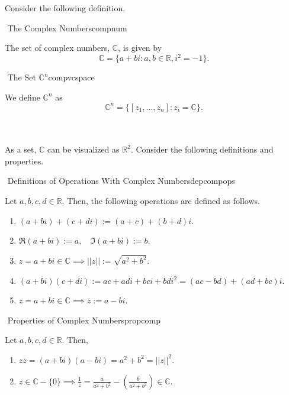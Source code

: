         Consider the following definition.
        \begin{definition}{\Stop\,\,The Complex Numbers}{compnum}

            The set of complex numbers, \(\mathbb{C}\), is given by
            \begin{equation*}
                \mathbb{C}=\{a+bi:a,b\in\mathbb{R},i^2=-1\}.
            \end{equation*}
            
        \end{definition}
        \begin{definition}{\Stop\,\,The Set \(\mathbb{C}^n\)}{compvcspace}

            We define \(\mathbb{C}^n\) as
            \begin{equation*}
                \mathbb{C}^n=\{[z_1,\ldots,z_n]:z_i=\mathbb{C}\}.
            \end{equation*}
            
        \end{definition}
        \vphantom
        \\
        \\
        As a set, \(\mathbb{C}\) can be visualized as \(\mathbb{R}^2\). Consider the following definitions and properties.
        \begin{definition}{\Stop\,\,Definitions of Operations With Complex Numbers}{depcompops}
            
            Let \(a,b,c,d\in\mathbb{R}\). Then, the following operations are defined as follows.
            \begin{enumerate}
                \item \((a+bi)+(c+di):=(a+c)+(b+d)i\).
                \item \(\Re (a+bi):=a,\quad \Im (a+bi):=b\).
                \item \(z=a+bi\in\mathbb{C}\implies||z||:=\sqrt{a^2+b^2}\).
                \item \((a+bi)(c+di):=ac+adi+bci+bdi^2=(ac-bd)+(ad+bc)i\).
                \item \(z=a+bi\in\mathbb{C}\implies\bar{z}:=a-bi\).
            \end{enumerate}

        \end{definition}
        \begin{theorem}{\Stop\,\,Properties of Complex Numbers}{propcomp}
            
            Let \(a,b,c,d\in\mathbb{R}\). Then,
            \begin{enumerate}
                \item \(z\bar{z}=(a+bi)(a-bi)=a^2+b^2=||z||^2\).
                \item \(z\in\mathbb{C}- \{0\}\implies\frac{1}{z}=\frac{a}{a^2+b^2}-\left(\frac{b}{a^2+b^2}\right)\in\mathbb{C}\).
            \end{enumerate}

        \end{theorem}
